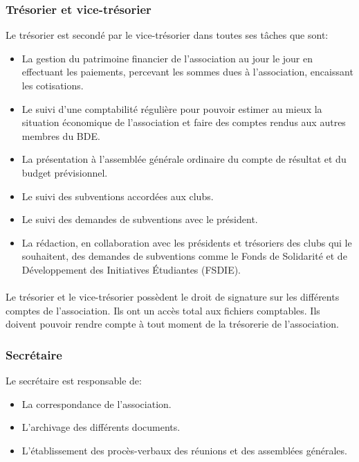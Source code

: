 \documentclass{article} %
\begin{document}
			\subsubsection{Trésorier et vice-trésorier}
\label{ssub:tresorier_et_vice_tresorier}

				Le trésorier est secondé par le vice-trésorier dans toutes ses
				tâches que sont:
				\begin{itemize}
					\item La gestion du patrimoine financier de l’association au
						jour le jour en effectuant les paiements, percevant les
						sommes dues à l’association, encaissant les cotisations.
					\item Le suivi d’une comptabilité régulière pour pouvoir
						estimer au mieux la situation économique de
						l’association et faire des comptes rendus aux autres
						membres du BDE\@.
					\item La présentation à l’assemblée générale ordinaire du
						compte de résultat et du budget prévisionnel.
					\item Le suivi des subventions accordées aux clubs.
					\item Le suivi des demandes de subventions avec le
						président.
					\item La rédaction, en collaboration avec
						les présidents et trésoriers des clubs qui le
						souhaitent, des demandes de subventions comme le Fonds
						de Solidarité et de Développement des Initiatives
						Étudiantes (FSDIE).
				\end{itemize}

                \paragraph{}
				Le trésorier et le vice-trésorier possèdent le droit de
				signature sur les différents comptes de
				l'association. Ils ont un accès
				total aux fichiers comptables. Ils doivent pouvoir rendre compte
				à tout moment de la trésorerie de l’association.

			\subsubsection{Secrétaire}
\label{ssub:secretaire}

				Le secrétaire est responsable de:
				\begin{itemize}
					\item La correspondance de l’association.
					\item L’archivage des différents documents.
					\item L’établissement des procès-verbaux des réunions et des
						assemblées générales.
				\end{itemize}
\end{document}
